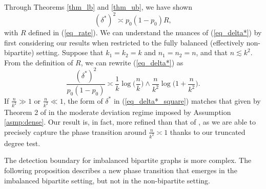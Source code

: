 \documentclass{article}
\begin{document}
Through Theorems \ref{thm_lb} and \ref{thm_ub}, we have shown
\begin{equation}\label{eq_delta*}
    (\delta^*)^2 \asymp p_0 (1- p_0) R,
\end{equation}
with $R$ defined in (\ref{eq_rate}). We can understand the nuances of (\ref{eq_delta*}) by first considering our results when restricted to the fully balanced (effectively non-bipartite) setting. Suppose that $k_1 = k_2 = k$ and $n_1 = n_2 = n$, and that $n \lesssim k^2$. From the definition of $R$, we can rewrite (\ref{eq_delta*}) as
\begin{equation}\label{eq_delta*_square}
\frac{(\delta^*)
^2}{p_0(1-p_0)} \asymp \frac{1}{k}\log\Big(\frac{n}{k}\Big) \land \frac{n}{k^2}\log\Big(1 + \frac{n}{k^2}\Big).
\end{equation}
If $\frac{n}{k^2} \gg 1$ or $\frac{n}{k^2} \ll 1$, the form of $\delta^*$ in (\ref{eq_delta*_square}) matches that given by Theorem 2 of \cite{arias2014community} in the moderate deviation regime imposed by Assumption \ref{asmp:dense}. Our result is, in fact, more refined than that of \cite{arias2014community}, as we are able to precisely capture the phase transition around $\frac{n}{k^2} \asymp 1$ thanks to our truncated degree test.

The detection boundary for imbalanced bipartite graphs is more complex. The following proposition describes a new phase transition that emerges in the imbalanced bipartite setting, but not in the non-bipartite setting.
\end{document}
